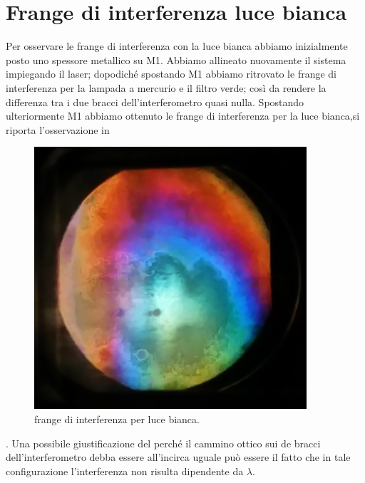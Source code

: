 \section{Frange di interferenza luce bianca}
Per osservare le frange di interferenza con la luce bianca
abbiamo inizialmente posto uno spessore metallico su M1.
Abbiamo allineato nuovamente il sistema impiegando il laser;
dopodiché spostando M1 abbiamo ritrovato le frange di interferenza
per la lampada a mercurio e il filtro verde; così da rendere 
la differenza tra i due bracci dell'interferometro quasi nulla.
Spostando ulteriormente M1 abbiamo ottenuto le frange di interferenza per
la luce bianca,si riporta l'osservazione in 
\bigskip
\begin{figure} [!h]
	\centering
	\includegraphics[width=0.9\textwidth]{./pictures/frange.jpg}
	\caption{frange di interferenza per luce bianca.}
	\label{fig:frangeb}
\end{figure}
\bigskip
{}.
Una possibile giustificazione del perché il cammino ottico sui
de bracci dell'interferometro debba essere all'incirca uguale può
essere il fatto che in tale configurazione l'interferenza non risulta
dipendente da $\lambda$.  